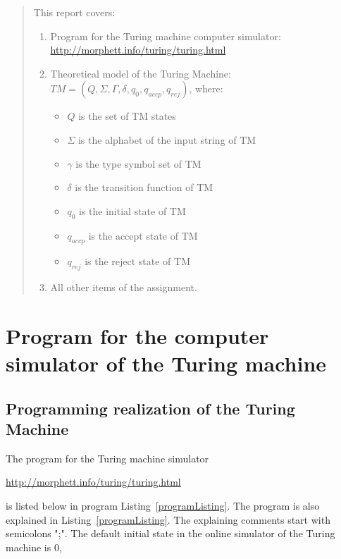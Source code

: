 \documentclass[12pt, a4paper]{report}
\begin{document}
\pagestyle{headings}

\markboth{}{}
\vspace{-15cm}
\begin{abstract}
	This report covers:
	\begin{enumerate}
		\item Program for the Turing machine computer simulator: \url{http://morphett.info/turing/turing.html}
		\item Theoretical model of the Turing Machine: $ TM = (Q, \Sigma, \Gamma, \delta, q_{0}, q_{accp}, q_{rej}) $, 
		where: 
			\begin{itemize}
				\item $Q$  is the set of TM states
				\item $\Sigma$  is the alphabet of the input string of TM
				\item $\gamma$  is the type symbol set of TM
				\item $\delta$  is the transition function of TM
				\item $q_{0}$ is the initial state of TM
				\item $q_{accp}$ is the accept state of TM
				\item $q_{rej}$  is the reject state of TM
				\end{itemize}
		\item All other items of the assignment.
		\end{enumerate}

	\end{abstract}
\newpage

\tableofcontents
{}


\newpage
\chapter{Program for the computer simulator of the Turing machine}
\section[]{Programming realization of the Turing Machine}

The program for the Turing machine simulator \cite{TuringSite} \vspace{-0.25cm}
{\center \url{http://morphett.info/turing/turing.html} \par}
\noindent
is listed below in program Listing~\ref{programListing}.
The program is also explained in Listing~\ref{programListing}. The explaining comments start with semicolons ";".
The default initial state in the online simulator of the Turing machine \cite{TuringSite} is $ 0 $,
\end{document}

